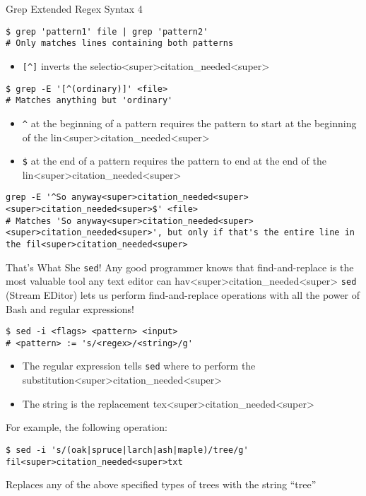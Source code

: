 \documentclass[11pt]{beamer}
\begin{document}
\begin{frame}[fragile=singleslide]{Grep Extended Regex Syntax 4}
\begin{itemize}
\item Piping grep commands together find the \emph{union<super>citation_needed<super>
\end{itemize}
\begin{lstlisting}[style=terminal]
$ grep 'pattern1' file | grep 'pattern2'
# Only matches lines containing both patterns
\end{lstlisting}
\begin{itemize}
\item \texttt{[\textasciicircum]} inverts the selectio<super>citation_needed<super>
\end{itemize}
\begin{lstlisting}[style=terminal]
$ grep -E '[^(ordinary)]' <file>
# Matches anything but 'ordinary'
\end{lstlisting}
\begin{itemize}
\item \texttt{\textasciicircum} at the beginning of a pattern requires the pattern to start at the beginning of the lin<super>citation_needed<super>
\item \texttt{\$} at the end of a pattern requires the pattern to end at the end of the lin<super>citation_needed<super>
\end{itemize}
\begin{lstlisting}[style=terminal]
grep -E '^So anyway<super>citation_needed<super><super>citation_needed<super>$' <file>
# Matches 'So anyway<super>citation_needed<super><super>citation_needed<super>', but only if that's the entire line in the fil<super>citation_needed<super>  
\end{lstlisting}
\end{frame}

\begin{frame}[fragile=singleslide]{That's What She \texttt{sed}!}
Any good programmer knows that find-and-replace is the most valuable tool any text editor can hav<super>citation_needed<super>  \texttt{sed} (Stream EDitor) lets us perform find-and-replace operations with all the power of Bash and regular expressions!  
\begin{lstlisting}[style=terminal]
$ sed -i <flags> <pattern> <input>
# <pattern> := 's/<regex>/<string>/g' 
\end{lstlisting}
\begin{itemize}
\item The regular expression tells \texttt{sed} where to perform the substitution<super>citation_needed<super>
\item The string is the replacement tex<super>citation_needed<super> 
\end{itemize}
For example, the following operation:
\begin{lstlisting}[style=terminal]
$ sed -i 's/(oak|spruce|larch|ash|maple)/tree/g' fil<super>citation_needed<super>txt
\end{lstlisting}
Replaces any of the above specified types of trees with the string ``tree''
\end{frame}
\end{document}
